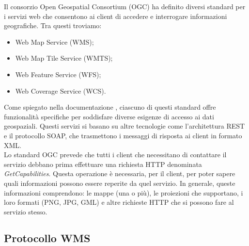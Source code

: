 Il consorzio Open Geospatial Consortium (OGC) ha definito diversi standard per i servizi web che consentono ai client di accedere e interrogare informazioni geografiche. Tra questi troviamo:
\begin{itemize}
      \item Web Map Service (WMS);
      \item Web Map Tile Service (WMTS);
      \item Web Feature Service (WFS);
      \item Web Coverage Service (WCS).
\end{itemize}
Come spiegato nella documentazione \cite{DocumentazioneOGC}, ciascuno di questi standard offre funzionalità specifiche per soddisfare diverse esigenze di accesso ai dati geospaziali. Questi servizi si basano su altre tecnologie come l'architettura REST e il protocollo SOAP, che trasmettono i messaggi di risposta ai client in formato XML.
\\Lo standard OGC prevede che tutti i client che necessitano di contattare il servizio debbano prima effettuare una richiesta HTTP denominata \textit{GetCapabilities}. Questa operazione è necessaria, per il client, per poter sapere quali informazioni possono essere reperite da quel servizio. In generale, queste informazioni comprendono: le mappe (una o più), le proiezioni che supportano, i loro formati (PNG, JPG, GML) e altre richieste HTTP che si possono fare al servizio stesso.

\subsection{Protocollo WMS}

